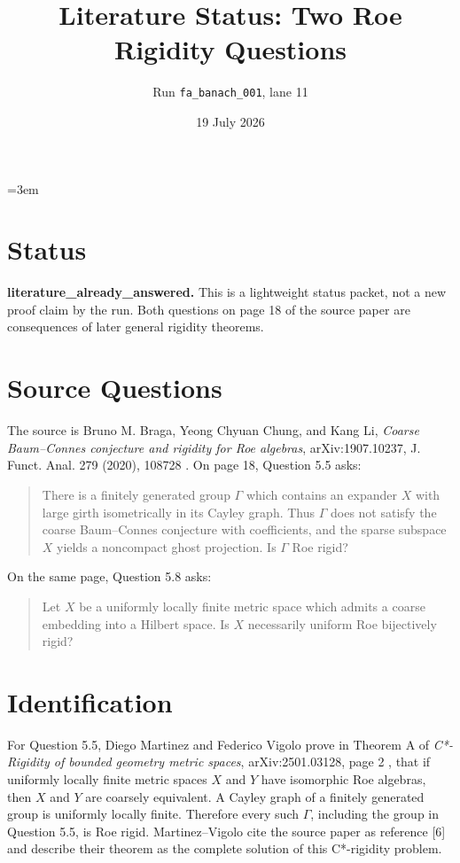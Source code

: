 \documentclass[11pt]{article}
\title{Literature Status: Two Roe Rigidity Questions}
\author{Run \texttt{fa\_banach\_001}, lane 11}
\date{19 July 2026}
\begin{document}
\emergencystretch=3em
\maketitle

\section*{Status}

\textbf{literature\_already\_answered.}
This is a lightweight status packet, not a new proof claim by the run.  Both
questions on page 18 of the source paper are consequences of later general
rigidity theorems.

\section*{Source Questions}

The source is Bruno M. Braga, Yeong Chyuan Chung, and Kang Li,
\emph{Coarse Baum--Connes conjecture and rigidity for Roe algebras},
arXiv:1907.10237, J. Funct. Anal. 279 (2020), 108728 \cite{BCL}.
On page 18, Question 5.5 asks:
\begin{quote}
There is a finitely generated group $\Gamma$ which contains an expander $X$
with large girth isometrically in its Cayley graph.  Thus $\Gamma$ does not
satisfy the coarse Baum--Connes conjecture with coefficients, and the sparse
subspace $X$ yields a noncompact ghost projection.  Is $\Gamma$ Roe rigid?
\end{quote}
On the same page, Question 5.8 asks:
\begin{quote}
Let $X$ be a uniformly locally finite metric space which admits a coarse
embedding into a Hilbert space.  Is $X$ necessarily uniform Roe bijectively
rigid?
\end{quote}

\section*{Identification}

For Question 5.5, Diego Martinez and Federico Vigolo prove in Theorem A of
\emph{C*-Rigidity of bounded geometry metric spaces}, arXiv:2501.03128,
page 2 \cite{MV}, that if uniformly locally finite metric spaces $X$ and $Y$
have isomorphic Roe algebras, then $X$ and $Y$ are coarsely equivalent.  A
Cayley graph of a finitely generated group is uniformly locally finite.
Therefore every such $\Gamma$, including the group in Question 5.5, is Roe
rigid.  Martinez--Vigolo cite the source paper as reference [6] and describe
their theorem as the complete solution of this C*-rigidity problem.
\end{document}
